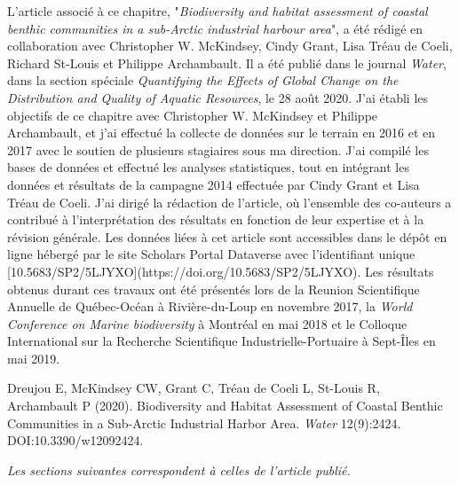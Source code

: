 L'article associé à ce chapitre, "\textit{Biodiversity and habitat assessment of coastal benthic communities in a sub-Arctic industrial harbour area}", a été rédigé en collaboration avec Christopher W. McKindsey, Cindy Grant, Lisa Tréau de Coeli, Richard St-Louis et Philippe Archambault. Il a été publié dans le journal \textit{Water}, dans la section spéciale \textit{Quantifying the Effects of Global Change on the Distribution and Quality of Aquatic Resources}, le 28 août 2020. J'ai établi les objectifs de ce chapitre avec Christopher W. McKindsey et Philippe Archambault, et j'ai effectué la collecte de données sur le terrain en 2016 et en 2017 avec le soutien de plusieurs stagiaires sous ma direction. J'ai compilé les bases de données et effectué les analyses statistiques, tout en intégrant les données et résultats de la campagne 2014 effectuée par Cindy Grant et Lisa Tréau de Coeli. J'ai dirigé la rédaction de l'article, où l'ensemble des co-auteurs a contribué à l'interprétation des résultats en fonction de leur expertise et à la révision générale. Les données liées à cet article sont accessibles dans le dépôt en ligne hébergé par le site Scholars Portal Dataverse avec l'identifiant unique [10.5683/SP2/5LJYXO](https://doi.org/10.5683/SP2/5LJYXO). Les résultats obtenus durant ces travaux ont été présentés lors de la Reunion Scientifique Annuelle de Québec-Océan à Rivière-du-Loup en novembre 2017, la \textit{World Conference on Marine biodiversity} à Montréal en mai 2018 et le Colloque International sur la Recherche Scientifique Industrielle-Portuaire à Sept-Îles en mai 2019.
\linebreak[4]

\begin{singlespace}
Dreujou E, McKindsey CW, Grant C, Tréau de Coeli L, St-Louis R, Archambault P (2020). Biodiversity and Habitat Assessment of Coastal Benthic Communities in a Sub-Arctic Industrial Harbor Area. \textit{Water} 12(9):2424. DOI:10.3390/w12092424.
\end{singlespace}

\textit{Les sections suivantes correspondent à celles de l'article publié.}
